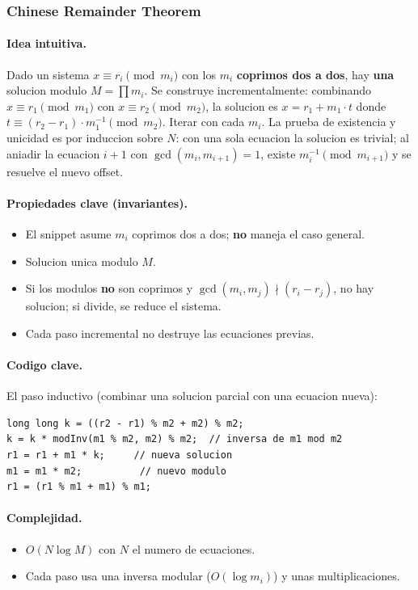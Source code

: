 ﻿\subsubsection{Chinese Remainder Theorem}

\paragraph{Idea intuitiva.}
Dado un sistema $x \equiv r_i \pmod{m_i}$ con los $m_i$ \textbf{coprimos dos a dos}, hay \textbf{una} solucion modulo $M = \prod m_i$. Se construye incrementalmente: combinando $x \equiv r_1 \pmod{m_1}$ con $x \equiv r_2 \pmod{m_2}$, la solucion es $x = r_1 + m_1 \cdot t$ donde $t \equiv (r_2 - r_1) \cdot m_1^{-1} \pmod{m_2}$. Iterar con cada $m_i$. La prueba de existencia y unicidad es por induccion sobre $N$: con una sola ecuacion la solucion es trivial; al aniadir la ecuacion $i+1$ con $\gcd(m_i, m_{i+1}) = 1$, existe $m_i^{-1} \pmod{m_{i+1}}$ y se resuelve el nuevo offset.

\paragraph{Propiedades clave (invariantes).}
\begin{itemize}\setlength\itemsep{0pt}
	\item El snippet asume $m_i$ coprimos dos a dos; \textbf{no} maneja el caso general.
	\item Solucion unica modulo $M$.
	\item Si los modulos \textbf{no} son coprimos y $\gcd(m_i, m_j) \nmid (r_i - r_j)$, no hay solucion; si divide, se reduce el sistema.
	\item Cada paso incremental no destruye las ecuaciones previas.
\end{itemize}

\paragraph{Codigo clave.}
El paso inductivo (combinar una solucion parcial con una ecuacion nueva):
\begin{verbatim}
long long k = ((r2 - r1) % m2 + m2) % m2;
k = k * modInv(m1 % m2, m2) % m2;  // inversa de m1 mod m2
r1 = r1 + m1 * k;     // nueva solucion
m1 = m1 * m2;          // nuevo modulo
r1 = (r1 % m1 + m1) % m1;
\end{verbatim}

\paragraph{Complejidad.}
\begin{itemize}\setlength\itemsep{0pt}
	\item $O(N \log M)$ con $N$ el numero de ecuaciones.
	\item Cada paso usa una inversa modular ($O(\log m_i)$) y unas multiplicaciones.
\end{itemize}

